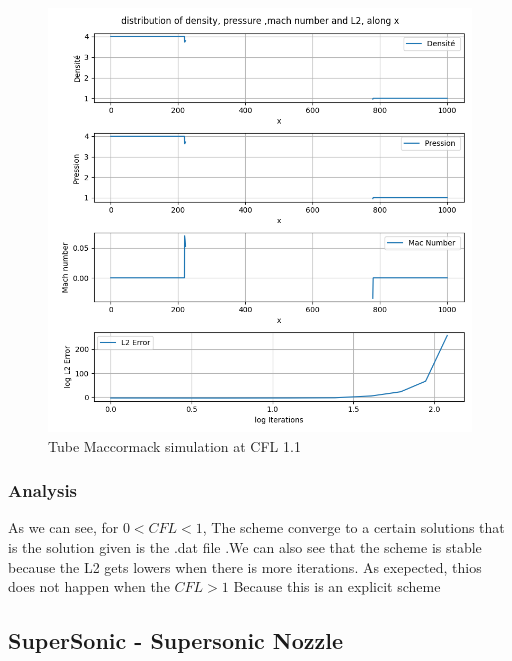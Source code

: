 \documentclass[12pt]{article}
\begin{document}
\begin{figure}[H] %
    \centering
    \includegraphics[width=\textwidth,height=\textheight,keepaspectratio]{PLOTS/tube_macormack_CFL110.png}
    \caption{Tube Maccormack simulation at CFL 1.1}
    \label{fig:your_label}
\end{figure}

\subsubsection{Analysis}

As we can see, for $ 0 < CFL < 1$, The scheme converge to a certain solutions that is the solution given is the .dat file
.We can also see that the scheme is stable because the L2 gets lowers when there is more iterations. As exepected, thios does 
not happen when the $CFL > 1$ Because this is an explicit scheme

\subsection{SuperSonic - Supersonic Nozzle}
\end{document}
